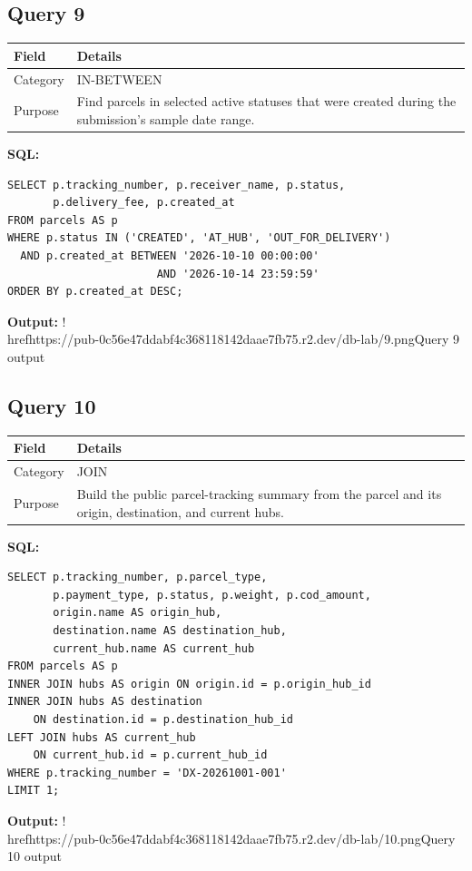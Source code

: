 \documentclass[11pt,a4paper]{article}
\begin{document}
\subsection{Query 9}
\begin{tabularx}{\linewidth}{>{\raggedright\arraybackslash}X|>{\raggedright\arraybackslash}X}
\hline
\textbf{Field} & \textbf{Details} \\ 
\hline
Category & IN-BETWEEN \\ 
\hline
Purpose & Find parcels in selected active statuses that were created during the submission's sample date range. \\ 
\hline
\end{tabularx}
\textbf{SQL:}
\begin{lstlisting}
SELECT p.tracking_number, p.receiver_name, p.status,
       p.delivery_fee, p.created_at
FROM parcels AS p
WHERE p.status IN ('CREATED', 'AT_HUB', 'OUT_FOR_DELIVERY')
  AND p.created_at BETWEEN '2026-10-10 00:00:00'
                       AND '2026-10-14 23:59:59'
ORDER BY p.created_at DESC;
\end{lstlisting}
\textbf{Output:}
!\\href{https://pub-0c56e47ddabf4c368118142daae7fb75.r2.dev/db-lab/9.png}{Query 9 output}
\subsection{Query 10}
\begin{tabularx}{\linewidth}{>{\raggedright\arraybackslash}X|>{\raggedright\arraybackslash}X}
\hline
\textbf{Field} & \textbf{Details} \\ 
\hline
Category & JOIN \\ 
\hline
Purpose & Build the public parcel-tracking summary from the parcel and its origin, destination, and current hubs. \\ 
\hline
\end{tabularx}
\textbf{SQL:}
\begin{lstlisting}
SELECT p.tracking_number, p.parcel_type,
       p.payment_type, p.status, p.weight, p.cod_amount,
       origin.name AS origin_hub,
       destination.name AS destination_hub,
       current_hub.name AS current_hub
FROM parcels AS p
INNER JOIN hubs AS origin ON origin.id = p.origin_hub_id
INNER JOIN hubs AS destination
    ON destination.id = p.destination_hub_id
LEFT JOIN hubs AS current_hub
    ON current_hub.id = p.current_hub_id
WHERE p.tracking_number = 'DX-20261001-001'
LIMIT 1;
\end{lstlisting}
\textbf{Output:}
!\\href{https://pub-0c56e47ddabf4c368118142daae7fb75.r2.dev/db-lab/10.png}{Query 10 output}
\end{document}
